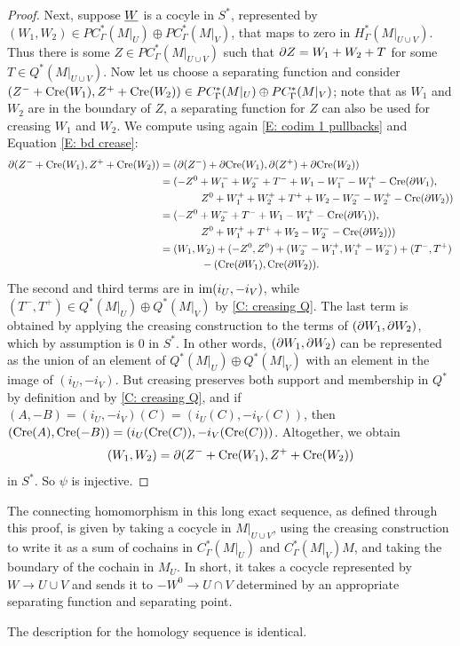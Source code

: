 \begin{proof}
Next, suppose $\underline{W}$ is a cocyle in $S^*$, represented by $(W_1,W_2) \in PC^*_\Gamma(M|_U) \oplus PC^*_\Gamma(M|_V)$, that maps to zero in $H_{\Gamma}^*(M|_{U \cup V})$. Thus there is
some $Z \in PC^*_\Gamma(M|_{U \cup V})$ such that $\partial Z = W_1+W_2+T$ for some $T \in Q^*(M|_{U \cup V})$.
Now let us choose a separating function and consider $(Z^-+\mathrm{Cre}(W_1),Z^++\mathrm{Cre}(W_2)) \in PC^*_\Gamma(M|_U) \oplus PC^*_\Gamma(M|_V)$; note that as $W_1$ and $W_2$ are in the boundary of $Z$, a separating function for $Z$ can also be used for creasing $W_1$ and $W_2$. We compute using again \cref{E: codim 1 pullbacks} and Equation \eqref{E: bd crease}:
\begin{align*}
\partial (Z^-+\mathrm{Cre}(W_1),Z^++\mathrm{Cre}(W_2))& = (\partial (Z^-)+\partial \mathrm{Cre}(W_1),\partial (Z^+)+\partial\mathrm{Cre}(W_2))\\
& = (-Z^0 + W_1^- + W_2^- + T^-+W_1 -W_1^- -W_1^+ -\mathrm{Cre}(\partial W_1),\\
&\qquad\qquad Z^0+ W_1^++ W_2^+ + T^++W_2 -W_2^- -W_2^+ -\mathrm{Cre}(\partial W_2))\\
& = (-Z^0 + W_2^- + T^-+W_1 -W_1^+ -\mathrm{Cre}(\partial W_1)),\\
&\qquad\qquad Z^0+ W_1^+ + T^++W_2 -W_2^- -\mathrm{Cre}(\partial W_2)))\\
& = (W_1,W_2)+ (-Z^0,Z^0) + (W_2^--W_1^+, W_1^+ -W_2^-) + (T^-,T^+)\\
&\qquad\qquad -(\mathrm{Cre}(\partial W_1),\mathrm{Cre}(\partial W_2)).
\end{align*}
The second and third terms are in $\text{im}(i_U,-i_V)$, while $(T^-,T^+) \in Q^*(M|_U) \oplus Q^*(M|_V)$ by \cref{C: creasing Q}.
 The last term is obtained by applying the creasing construction to the terms of $(\partial W_1,\partial W_2)$, which by assumption is $0$ in $S^*$. In other words, $(\partial W_1,\partial W_2)$ can be represented as the union of an element of $Q^*(M|_U) \oplus Q^*(M|_V)$ with an element in the image of $(i_U,-i_V)$. But creasing preserves both support and membership in $Q^*$ by definition and by \cref{C: creasing Q}, and if $(A,-B) = (i_U,-i_V)(C) = (i_U(C),-i_V(C))$, then $(\mathrm{Cre}(A),\mathrm{Cre}(-B)) = (i_U(\mathrm{Cre}(C)),-i_V(\mathrm{Cre}(C)))$. Altogether, we obtain $$(W_1,W_2) = \partial (Z^-+\mathrm{Cre}(W_1),Z^++\mathrm{Cre}(W_2))$$ in $S^*$. So $\psi$ is injective.
\end{proof}

\begin{remark}\label{R: MV boundary}
The connecting homomorphism in this long exact sequence, as defined through this proof, is given by taking a cocycle in $M|_{U \cup V}$,
using the creasing construction to write it as a sum of cochains in $C^*_\Gamma(M|_{U})$ and $C^*_\Gamma(M|_{V})M$, and taking the boundary of the cochain in $M_U$.
In short, it takes a cocycle represented by $W \to U \cup V$ and sends it to $-W^0 \to U \cap V$ determined by an appropriate separating function and separating point.

The description for the homology sequence is identical.
\end{remark}

